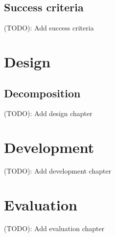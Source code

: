 \documentclass[a4paper]{report}
\begin{document}
\section{Success criteria}

(TODO): Add success criteria

\chapter{Design}

\section{Decomposition}

(TODO): Add design chapter

\chapter{Development}

(TODO): Add development chapter

\chapter{Evaluation}

(TODO): Add evaluation chapter
\end{document}
